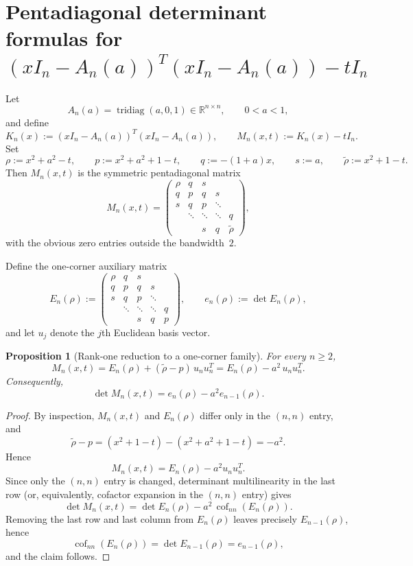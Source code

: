 \documentclass[11pt]{article}
\numberwithin{equation}{section}
\newtheorem{proposition}[theorem]{Proposition}
\begin{document}
\section{Pentadiagonal determinant formulas for \texorpdfstring{$(xI_n-A_n(a))^T(xI_n-A_n(a))-tI_n$}{(xI\_n-A\_n(a)) transpose (xI\_n-A\_n(a)) - tI\_n}}

Let
\[
A_n(a)=\operatorname{tridiag}(a,0,1)\in \mathbb{R}^{n\times n},
\qquad 0<a<1,
\]
and define
\[
K_n(x):=(xI_n-A_n(a))^T(xI_n-A_n(a)),
\qquad
M_n(x,t):=K_n(x)-tI_n.
\]
Set
\[
\rho:=x^2+a^2-t,\qquad
p:=x^2+a^2+1-t,\qquad
q:=-(1+a)x,\qquad
s:=a,\qquad
\widetilde\rho:=x^2+1-t.
\]
Then $M_n(x,t)$ is the symmetric pentadiagonal matrix
\[
M_n(x,t)=
\begin{pmatrix}
\rho & q & s \\
q & p & q & s \\
s & q & p & \ddots \\
& \ddots & \ddots & \ddots & q \\
& & s & q & \widetilde\rho
\end{pmatrix},
\]
with the obvious zero entries outside the bandwidth~$2$.

\medskip

Define the one-corner auxiliary matrix
\[
E_n(\rho):=
\begin{pmatrix}
\rho & q & s \\
q & p & q & s \\
s & q & p & \ddots \\
& \ddots & \ddots & \ddots & q \\
& & s & q & p
\end{pmatrix},
\qquad
e_n(\rho):=\det E_n(\rho),
\]
and let $u_j$ denote the $j$th Euclidean basis vector.

\begin{proposition}[Rank-one reduction to a one-corner family]
For every $n\ge 2$,
\[
M_n(x,t)=E_n(\rho)+(\widetilde\rho-p)\,u_nu_n^T
       =E_n(\rho)-a^2\,u_nu_n^T.
\]
Consequently,
\[
\det M_n(x,t)=e_n(\rho)-a^2 e_{n-1}(\rho).
\]
\end{proposition}

\begin{proof}
By inspection, $M_n(x,t)$ and $E_n(\rho)$ differ only in the $(n,n)$ entry, and
\[
\widetilde\rho-p=(x^2+1-t)-(x^2+a^2+1-t)=-a^2.
\]
Hence
\[
M_n(x,t)=E_n(\rho)-a^2u_nu_n^T.
\]
Since only the $(n,n)$ entry is changed, determinant multilinearity in the last row
(or, equivalently, cofactor expansion in the $(n,n)$ entry) gives
\[
\det M_n(x,t)=\det E_n(\rho)-a^2\,\operatorname{cof}_{nn}(E_n(\rho)).
\]
Removing the last row and last column from $E_n(\rho)$ leaves precisely
$E_{n-1}(\rho)$, hence
\[
\operatorname{cof}_{nn}(E_n(\rho))=\det E_{n-1}(\rho)=e_{n-1}(\rho),
\]
and the claim follows.
\end{proof}
\end{document}
